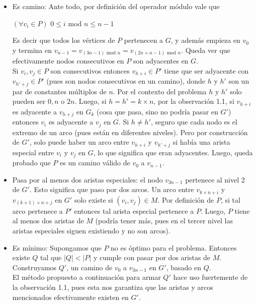 \begin{itemize}
	\item Es camino: Ante todo, por definición del operador módulo vale que
	\begin{center}
		$(\forall v_i\in P)$ $0\leq i$ mod $n\leq n-1$
	\end{center}

	 Es decir que todos los vértices de $P$ pertenecen a $G$, y además empieza en $v_0$ y termina en $v_{n-1} = v_{(3n-1)\text{ mod } n}=v_{(2n+n-1)\text{ mod } n} $. Queda ver que efectivamente nodos consecutivos en $P$ son adyacentes en $G$. \\Si $v_i, v_j\in P$ son consecutivos entonces $v_{h+i}\in P'$ tiene que ser adyacente con $v_{h'+j}\in P'$ (pues son nodos consecutivos en un camino), donde $h$ y $h'$ son un par de constantes múltiplos de $n$. Por el contexto del problema $h$ y $h'$ solo pueden ser $0, n$ o $2n$. Luego, si $h=h'=k\times n$, por la observación 1.1, si $v_{h+i}$ es adyacente a $v_{h+j}$ en $G_k$ (cosa que pasa, sino no podría pasar en $G'$) entonces $v_i$ es adyacente a $v_j$ en $G$. Si $h\neq h'$, seguro que cada nodo es el extremo de un arco (pues están en diferentes niveles). Pero por construcción de $G'$, solo puede haber un arco entre $v_{h+i}$ y $v_{h'+j}$ si había una arista especial entre $v_i$ y $v_j$ en $G$, lo que significa que eran adyacentes. Luego, queda probado que $P$ es un camino válido de $v_0$ a $v_{n-1}$.
	\item Pasa por al menos dos aristas especiales: el nodo $v_{3n-1}$ pertenece al nivel 2 de $G'$. Esto significa que paso por dos arcos. Un arco entre $v_{k\times n + i}$ y $v_{(k+1)\times n + j}$ en $G'$ solo existe si $(v_i, v_j)\in M$. Por definición de $P$, si tal arco pertenece a $P'$ entonces tal arista especial pertenece a $P$. Luego, $P$ tiene al menos dos aristas de $M$ (podría tener más, pues en el tercer nivel las aristas especiales siguen existiendo y no son arcos).
	\item Es mínimo: Supongamos que $P$ no es óptimo para el problema. Entonces existe $Q$ tal que $|Q| < |P|$ y cumple con pasar por dos aristas de $M$. Construyamos $Q'$, un camino de $v_0$ a $v_{3n-1}$ en $G'$, basado en $Q$.\\
	El método propuesto a continuación para armar $Q'$ hace uso fuertemente de la observación 1.1, pues esta nos garantiza que las aristas y arcos mencionados efectivamente existen en $G'$.\\

\end{itemize}
